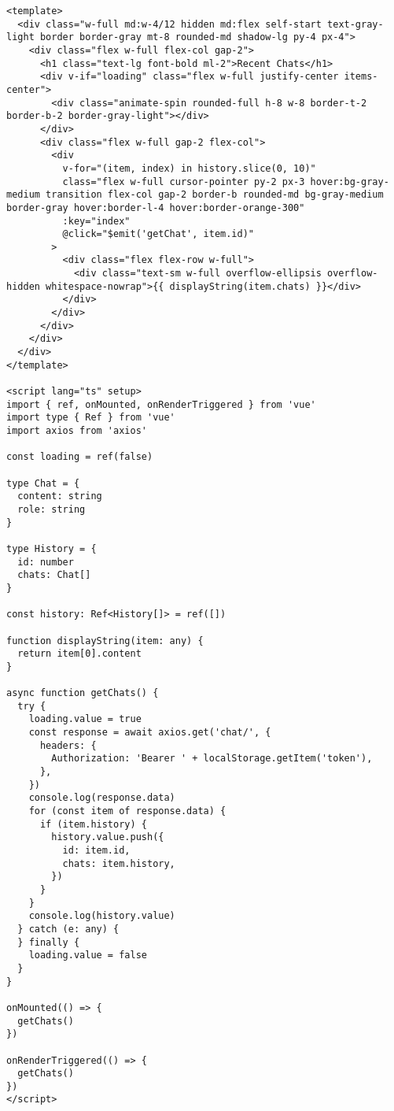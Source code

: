 \begin{Verbatim}[breaklines=true, breakanywhere=true]
<template>
  <div class="w-full md:w-4/12 hidden md:flex self-start text-gray-light border border-gray mt-8 rounded-md shadow-lg py-4 px-4">
    <div class="flex w-full flex-col gap-2">
      <h1 class="text-lg font-bold ml-2">Recent Chats</h1>
      <div v-if="loading" class="flex w-full justify-center items-center">
        <div class="animate-spin rounded-full h-8 w-8 border-t-2 border-b-2 border-gray-light"></div>
      </div>
      <div class="flex w-full gap-2 flex-col">
        <div
          v-for="(item, index) in history.slice(0, 10)"
          class="flex w-full cursor-pointer py-2 px-3 hover:bg-gray-medium transition flex-col gap-2 border-b rounded-md bg-gray-medium border-gray hover:border-l-4 hover:border-orange-300"
          :key="index"
          @click="$emit('getChat', item.id)"
        >
          <div class="flex flex-row w-full">
            <div class="text-sm w-full overflow-ellipsis overflow-hidden whitespace-nowrap">{{ displayString(item.chats) }}</div>
          </div>
        </div>
      </div>
    </div>
  </div>
</template>

<script lang="ts" setup>
import { ref, onMounted, onRenderTriggered } from 'vue'
import type { Ref } from 'vue'
import axios from 'axios'

const loading = ref(false)

type Chat = {
  content: string
  role: string
}

type History = {
  id: number
  chats: Chat[]
}

const history: Ref<History[]> = ref([])

function displayString(item: any) {
  return item[0].content
}

async function getChats() {
  try {
    loading.value = true
    const response = await axios.get('chat/', {
      headers: {
        Authorization: 'Bearer ' + localStorage.getItem('token'),
      },
    })
    console.log(response.data)
    for (const item of response.data) {
      if (item.history) {
        history.value.push({
          id: item.id,
          chats: item.history,
        })
      }
    }
    console.log(history.value)
  } catch (e: any) {
  } finally {
    loading.value = false
  }
}

onMounted(() => {
  getChats()
})

onRenderTriggered(() => {
  getChats()
})
</script>

\end{Verbatim}

